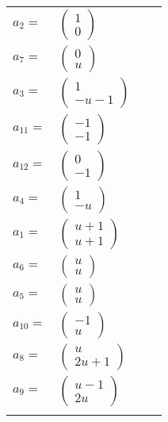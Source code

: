 \documentclass[1p]{elsarticle_modified}
\theoremstyle{definition}
\begin{document}
\begin{tabular}{m{7pt} m{180pt} m{7pt} m{180pt} }
\flushright $a_{2}=$&$\begin{pmatrix}1\\0\end{pmatrix}$ \\
\flushright $a_{7}=$&$\begin{pmatrix}0\\u\end{pmatrix}$ \\
\flushright $a_{3}=$&$\begin{pmatrix}1\\- u-1\end{pmatrix}$ \\
\flushright $a_{11}=$&$\begin{pmatrix}-1\\-1\end{pmatrix}$ \\
\flushright $a_{12}=$&$\begin{pmatrix}0\\-1\end{pmatrix}$ \\
\flushright $a_{4}=$&$\begin{pmatrix}1\\- u\end{pmatrix}$ \\
\flushright $a_{1}=$&$\begin{pmatrix}u+1\\u+1\end{pmatrix}$ \\
\flushright $a_{6}=$&$\begin{pmatrix}u\\u\end{pmatrix}$ \\
\flushright $a_{5}=$&$\begin{pmatrix}u\\u\end{pmatrix}$ \\
\flushright $a_{10}=$&$\begin{pmatrix}-1\\u\end{pmatrix}$ \\
\flushright $a_{8}=$&$\begin{pmatrix}u\\2 u+1\end{pmatrix}$ \\
\flushright $a_{9}=$&$\begin{pmatrix}u-1\\2 u\end{pmatrix}$\\&\end{tabular}
\end{document}
